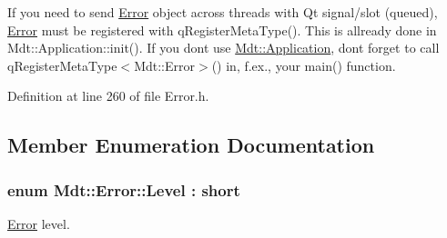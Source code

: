 If you need to send \hyperlink{class_mdt_1_1_error}{Error} object across threads with Qt signal/slot (queued), \hyperlink{class_mdt_1_1_error}{Error} must be registered with q\+Register\+Meta\+Type(). This is allready done in Mdt\+::\+Application\+::init(). If you don\textquotesingle{}t use \hyperlink{class_mdt_1_1_application}{Mdt\+::\+Application}, don\textquotesingle{}t forget to call q\+Register\+Meta\+Type$<$\+Mdt\+::\+Error$>$() in, f.\+ex., your main() function. 

Definition at line 260 of file Error.\+h.



\subsection{Member Enumeration Documentation}
\subsubsection[{\texorpdfstring{Level}{Level}}]{\setlength{\rightskip}{0pt plus 5cm}enum {\bf Mdt\+::\+Error\+::\+Level} \+: short}\hypertarget{class_mdt_1_1_error_ab533dc690f68a8635232db594194a068}{}\label{class_mdt_1_1_error_ab533dc690f68a8635232db594194a068}


\hyperlink{class_mdt_1_1_error}{Error} level. 

